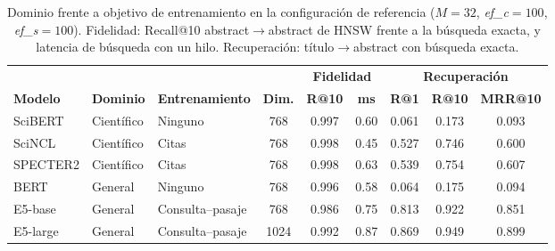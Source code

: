 \begin{table}[tbp]
\caption{Dominio frente a objetivo de entrenamiento en la configuración de referencia ($M=32$, \textit{ef\_c}$=100$, \textit{ef\_s}$=100$). Fidelidad: Recall@10 abstract$\rightarrow$abstract de HNSW frente a la búsqueda exacta, y latencia de búsqueda con un hilo. Recuperación: título$\rightarrow$abstract con búsqueda exacta.}\label{tab:modelos}
\centering
\small
\begin{tabular}{|l|l|l|c|c|c|c|c|c|}
\hline
\multicolumn{4}{|c|}{} & \multicolumn{2}{c|}{\textbf{Fidelidad}} & \multicolumn{3}{c|}{\textbf{Recuperación}} \\ \cline{5-9}
\textbf{Modelo} & \textbf{Dominio} & \textbf{Entrenamiento} & \textbf{Dim.} & \textbf{R@10} & \textbf{ms} & \textbf{R@1} & \textbf{R@10} & \textbf{MRR@10} \\
\hline
SciBERT & Científico & Ninguno & 768 & 0.997 & 0.60 & 0.061 & 0.173 & 0.093 \\
SciNCL & Científico & Citas & 768 & 0.998 & 0.45 & 0.527 & 0.746 & 0.600 \\
SPECTER2 & Científico & Citas & 768 & 0.998 & 0.63 & 0.539 & 0.754 & 0.607 \\
BERT & General & Ninguno & 768 & 0.996 & 0.58 & 0.064 & 0.175 & 0.094 \\
E5-base & General & Consulta--pasaje & 768 & 0.986 & 0.75 & 0.813 & 0.922 & 0.851 \\
E5-large & General & Consulta--pasaje & 1024 & 0.992 & 0.87 & 0.869 & 0.949 & 0.899 \\
\hline
\end{tabular}
\end{table}